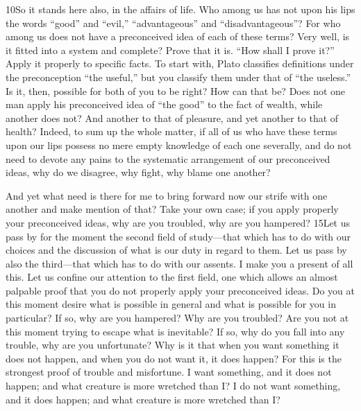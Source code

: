 10So it stands here also, in the affairs of life. Who among us has not upon his lips the words ``good'' and ``evil,'' ``advantageous'' and ``disadvantageous''? For who among us does not have a preconceived idea of each of these terms? Very well, is it fitted into a system and complete? Prove that it is. ``How shall I prove it?'' Apply it properly to specific facts. To start with, Plato classifies definitions under the preconception ``the useful,'' but you classify them under that of ``the useless.'' Is it, then, possible for both of you to be right? How can that be? Does not one man apply his preconceived idea of ``the good'' to the fact of wealth, while another does not? And another to that of pleasure, and yet another to that of health? Indeed, to sum up the whole matter, if all of us who have these terms upon our lips possess no mere empty knowledge of each one severally, and do not need to devote any pains to the systematic arrangement of our preconceived ideas, why do we disagree, why fight, why blame one another?

And yet what need is there for me to bring forward now our strife with one another and make mention of that? Take your own case; if you apply properly your preconceived ideas, why are you troubled, why are you hampered? 15Let us pass by for the moment the second field of study—that which has to do with our choices and the discussion of what is our duty in regard to them. Let us pass by also the third—that which has to do with our assents. I make you a present of all this. Let us confine our attention to the first field, one which allows an almost palpable proof that you do not properly apply your preconceived ideas. Do you at this moment desire what is possible in general and what is possible for you in particular? If so, why are you hampered? Why are you troubled? Are you not at this moment trying to escape what is inevitable? If so, why do you fall into any trouble, why are you unfortunate? Why is it that when you want something it does not happen, and when you do not want it, it does happen? For this is the strongest proof of trouble and misfortune. I want something, and it does not happen; and what creature is more wretched than I? I do not want something, and it does happen; and what creature is more wretched than I?

